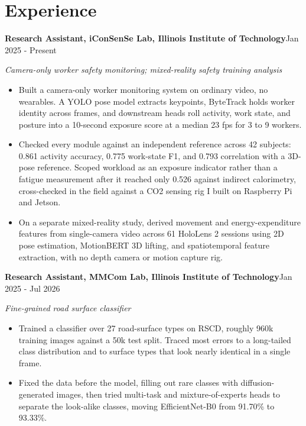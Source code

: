 \documentclass[letterpaper,10pt]{extarticle}
\newcommand{\role}[3]{%
  \textbf{#1}\hfill #3\par
  {\small\itshape #2}\par\vspace{0.5pt}
}
\begin{document}
\section{Experience}

\role{Research Assistant, iConSenSe Lab, Illinois Institute of Technology}{Camera-only worker safety monitoring; mixed-reality safety training analysis}{Jan 2025 - Present}
\begin{itemize}
  \item Built a camera-only worker monitoring system on ordinary video, no wearables. A YOLO pose
        model extracts keypoints, ByteTrack holds worker identity across frames, and downstream heads
        roll activity, work state, and posture into a 10-second exposure score at a median 23 fps for
        3 to 9 workers.
  \item Checked every module against an independent reference across 42 subjects: 0.861 activity
        accuracy, 0.775 work-state F1, and 0.793 correlation with a 3D-pose reference. Scoped workload
        as an exposure indicator rather than a fatigue measurement after it reached only 0.526 against
        indirect calorimetry, cross-checked in the field against a CO2 sensing rig I built on
        Raspberry Pi and Jetson.
  \item On a separate mixed-reality study, derived movement and energy-expenditure features from
        single-camera video across 61 HoloLens 2 sessions using 2D pose estimation, MotionBERT 3D
        lifting, and spatiotemporal feature extraction, with no depth camera or motion capture rig.
\end{itemize}

\role{Research Assistant, MMCom Lab, Illinois Institute of Technology}{Fine-grained road surface classifier}{Jan 2025 - Jul 2026}
\begin{itemize}
  \item Trained a classifier over 27 road-surface types on RSCD, roughly 960k training images
        against a 50k test split. Traced most errors to a long-tailed class distribution and to
        surface types that look nearly identical in a single frame.
  \item Fixed the data before the model, filling out rare classes with diffusion-generated images,
        then tried multi-task and mixture-of-experts heads to separate the look-alike classes, moving
        EfficientNet-B0 from 91.70\% to 93.33\%.
\end{itemize}
\end{document}
